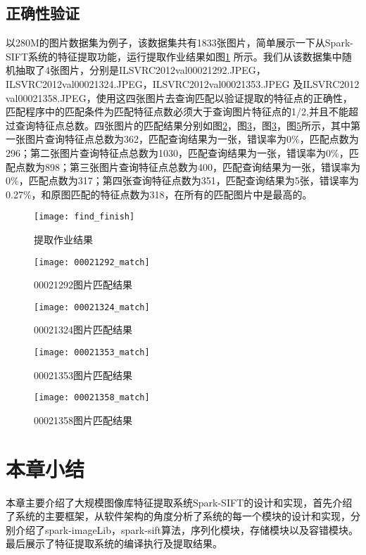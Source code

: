 \subsection{正确性验证}
以280M的图片数据集为例子，该数据集共有1833张图片，简单展示一下从Spark-SIFT系统的特征提取功能，运行提取作业结果如图\ref{fig:find_finish} 所示。我们从该数据集中随机抽取了4张图片，分别是ILSVRC2012\textunderscore val\textunderscore00021292.JPEG，ILSVRC2012\textunderscore val\textunderscore00021324.JPEG，ILSVRC2012\textunderscore val\textunderscore00021353.JPEG 及ILSVRC2012\textunderscore\\val\textunderscore00021358.JPEG，使用这四张图片去查询匹配以验证提取的特征点的正确性，匹配程序中的匹配条件为匹配特征点数必须大于查询图片特征点的1/2,并且不能超过查询特征点总数。四张图片的匹配结果分别如图\ref{fig:00021292_match}，图\ref{fig:00021324_match}，图\ref{fig:00021324_match}，图\ref{fig:00021358_match}所示，其中第一张图片查询特征点总数为362，匹配查询结果为一张，错误率为0\%，匹配点数为296；第二张图片查询特征点总数为1030，匹配查询结果为一张，错误率为0\%，匹配点数为898；第三张图片查询特征点总数为400，匹配查询结果为一张，错误率为0\%，匹配点数为317；第四张查询特征点数为351，匹配查询结果为5张，错误率为0.27\%，和原图匹配的特征点数为318，在所有的匹配图片中是最高的。
\begin{figure}[htp]
\centering
\texttt{[image: find\_finish]}
\caption{提取作业结果}
\label{fig:find_finish}
\end{figure}

\begin{figure}[htp]
\centering
\texttt{[image: 00021292\_match]}
\caption{00021292图片匹配结果}
\label{fig:00021292_match}
\end{figure}

\begin{figure}[htp]
\centering
\texttt{[image: 00021324\_match]}
\caption{00021324图片匹配结果}
\label{fig:00021324_match}
\end{figure}

\begin{figure}[htp]
\centering
\texttt{[image: 00021353\_match]}
\caption{00021353图片匹配结果}
\label{fig:00021353_match}
\end{figure}

\begin{figure}[htp]
\centering
\texttt{[image: 00021358\_match]}
\caption{00021358图片匹配结果}
\label{fig:00021358_match}
\end{figure}

\section{本章小结}
本章主要介绍了大规模图像库特征提取系统Spark-SIFT的设计和实现，首先介绍了系统的主要框架，从软件架构的角度分析了系统的每一个模块的设计和实现，分别介绍了spark-imageLib，spark-sift算法，序列化模块，存储模块以及容错模块。最后展示了特征提取系统的编译执行及提取结果。
